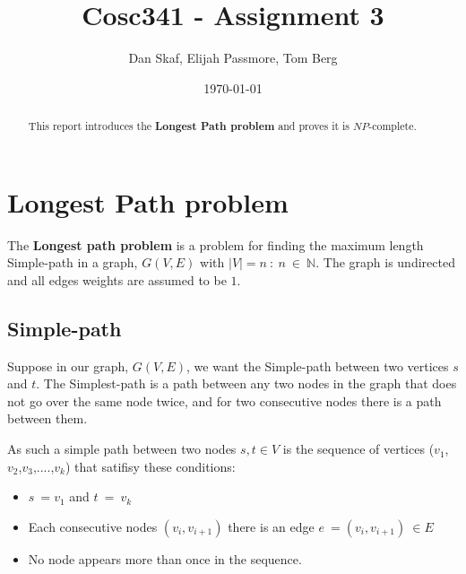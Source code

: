 \documentclass[a4paper,11pt]{article}
\title{Cosc341 - Assignment 3}
\author{Dan Skaf, Elijah Passmore, Tom Berg}
\date{\today}
\begin{document}
\maketitle

\begin{abstract}
This report introduces the \textbf{Longest Path problem} and proves it is $NP$-complete.
\end{abstract}

\section{Longest Path problem}
The \textbf{Longest path problem} is a problem for finding the maximum length 
Simple-path in a graph, $G(V,E)$ with $\left|V\right|=n\::\:n\:\in\:\mathbb{N}$.
The graph is undirected and all edges weights are assumed to be $1$.

\subsection{Simple-path} 
Suppose in our graph, $G(V,E)$, we want the Simple-path between two vertices 
$s$ and $t$. The Simplest-path is a path between any two nodes in the graph that 
does not go over the same node twice, and for two consecutive nodes there is a 
path between them.

As such a simple path between two nodes $s,t\in V$ is the sequence of vertices 
($v_1$,$v_2$,$v_3$,$....$,$v_k$) that satifisy these conditions:
\begin{itemize}
    \item $s\:=v_1$ and $t\:=\:v_k$
    \item Each consecutive nodes $\left(v_i,v_{i+1}\right)$ there is an 
    edge $e\:=\left(v_i,v_{i+1}\right)\:\in E$
    \item No node appears more than once in the sequence.
\end{itemize}
\end{document}

